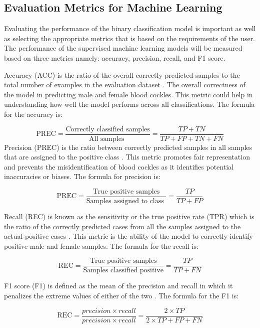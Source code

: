 \subsection{Evaluation Metrics for Machine Learning}
Evaluating the performance of the binary classification model is important as well as selecting the appropriate metrics that is based on the requirements of the user. The performance of the supervised machine learning models will be measured based on three metrics namely: accuracy, precision, recall, and F1 score. 

Accuracy (ACC) is the ratio of the overall correctly predicted samples to the total number of examples in the evaluation dataset \cite{cui2020}. The overall correctness of the model in predicting male and female blood cockles. This metric could help in understanding how well the model performs across all classifications. The formula for the accuracy is: 

\begin{equation}
	\text{PREC} = \frac{\text{Correctly classified samples}} {\text{All samples }} = \frac{TP+ TN}{TP + FP + TN + FN}
	\label{eq:acc}
\end{equation}
Precision (PREC) is the ratio between correctly predicted samples in all samples that are assigned to the positive class \cite{cui2020}. This metric promotes fair representation and prevents the misidentification of blood cockles as it identifies potential inaccuracies or biases. The formula for precision is:


\begin{equation}
	\text{PREC} = \frac{\text{True positive samples}} {\text{Samples assigned to class }} = \frac{TP}{TP + FP}
	\label{eq:prec}
\end{equation}

Recall (REC) is known as the sensitivity or the true positive rate (TPR) which is the ratio of the correctly predicted cases from all the samples assigned to the actual positive cases \cite{cui2020}. This metric is the ability of the model to correctly identify positive male and female samples. The formula for the recall is:

\begin{equation}
	\text{REC} = \frac{\text{True positive samples}} {\text{Samples classified positive}} = \frac{TP}{TP + FN}
	\label{eq:rec}
\end{equation}

F1 score (F1) is defined as the mean of the precision and recall in which it penalizes the extreme values of either of the two \cite{cui2020}. The formula for the F1 is: 

\begin{equation}
	\text{REC} = \frac{ precision \times recall }{precision \times recall }= \frac{2 \times TP}{2 \times TP + FP + FN}
	\label{eq:f1}
\end{equation}




